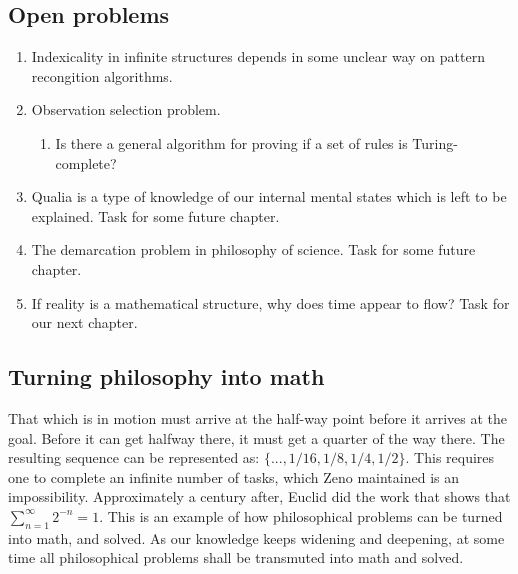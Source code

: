 \newpage

\subsection{Open problems}

\vspace{10px}

\begin{enumerate}
\item Indexicality in infinite structures depends in some unclear way on pattern recongition algorithms.
\item Observation selection problem.
\begin{enumerate}
\item Is there a general algorithm for proving if a set of rules is Turing-complete?
\end{enumerate}
\item Qualia is a type of knowledge of our internal mental states which is left to be explained. Task for some future chapter.
\item The demarcation problem in philosophy of science. Task for some future chapter.
\item If reality is a mathematical structure, why does time appear to flow? Task for our next chapter.
\end{enumerate}

\newpage

\subsection{Turning philosophy into math}

That which is in motion must arrive at the half-way point before it arrives at the goal.
Before it can get halfway there, it must get a quarter of the way there.
The resulting sequence can be represented as: $\{..., 1/16, 1/8, 1/4, 1/2\}$.
This requires one to complete an infinite number of tasks, which Zeno maintained is an impossibility.
Approximately a century after, Euclid did the work that shows that $\sum_{n=1}^{\infty} 2^{-n} = 1$.
This is an example of how philosophical problems can be turned into math, and solved.
As our knowledge keeps widening and deepening, at some time all philosophical problems shall be transmuted into math and solved.

\newpage


